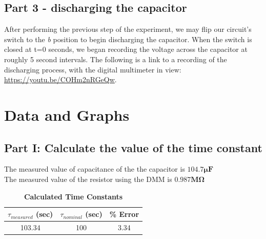 \documentclass[titlepage]{article}
\begin{document}
    \subsection{Part 3 - discharging the capacitor}
    After performing the previous step of the experiment, we may flip our circuit's switch to the \emph{b} position to begin discharging the capacitor. When the switch is closed at t=0 seconds, we began recording the voltage across the capacitor at roughly 5 second intervals. 
    The following is a link to a recording of the discharging process, with the digital multimeter in view: \url{https://youtu.be/COHm2nRGeQw}.




	\section{Data and Graphs}
	\subsection{Part I: Calculate the value of the time constant}
		The measured value of capacitance of the the capacitor is
		\(\mathbf{ 104.7\pmb{\mu} F }\) \\
		The measured value of the resistor using the DMM is
	\(\pmb{0.987 M\Omega} \)
		\begin{table}[ht!]
			\caption*{\textbf{Calculated Time Constants}}
			\centering
			\begin{tabular}{c|c|c}
				$\tau_{measured}$ (sec) & $\tau_{nominal}$ (sec) & \% Error \\
				\hline
				103.34 & 100 & 3.34
			\end{tabular}
		\end{table}
\end{document}
